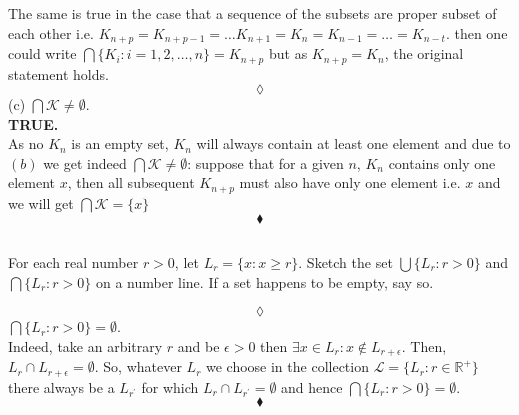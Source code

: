 The same is true in the case that a sequence of the subsets are proper subset of each other i.e. $K_{n+p}=K_{n+p-1}=\dots K_{n+1}=K_{n} = K_{n-1}=\dots =  K_{n-t}$. then one could write $\bigcap \{K_i:i=1,2,\dots,n\}= K_{n+p}$ but as $K_{n+p}=K_n$, the original statement holds.
$$\lozenge$$
(c) $\bigcap \mathscr{K}\ne \emptyset$.\\
\textbf{TRUE.\\}
As no $K_n$ is an empty set, $K_n$ will always contain at least one element and due to $(b)$ we get indeed $\bigcap \mathscr{K}\ne \emptyset$: suppose that for a given $n$, $K_n$ contains only one element $x$, then all subsequent $K_{n+p}$ must also have only one element i.e. $x$ and we will get $\bigcap \mathscr{K}=\{x\}$ 
$$\blacklozenge$$

\subsection{}
\begin{tcolorbox}
For each real number $r>0$, let $L_r=\{x:x\ge r\}$. Sketch the set $\bigcup \{L_r:r>0\}$ and $\bigcap\{L_r:r>0\}$ on a number line. If a set happens to be empty, say so.
\end{tcolorbox}
\begin{figure}[H]%
    \centering
    \subfloat[$\bigcup \{L_r:r>0\}$]{}
\label{fig:fig_p8b}
\end{figure}
$$\lozenge$$
$\bigcap\{L_r:r>0\}=\emptyset$.\\

Indeed, take an arbitrary $r$ and  be $\epsilon > 0$ then $\exists x\in L_r: x\not \in L_{r+\epsilon}$. Then, $L_r\cap L_{r+\epsilon} =\emptyset$. So, whatever $L_r$ we choose in the collection $\mathscr{L}=\{L_r: r\in\mathbb{R}^+\}$ there always be a $L_{r^{'}}$ for which $L_r\cap L_{r^{'}}=\emptyset$ and hence $\bigcap\{L_r:r>0\}=\emptyset$.
$$\blacklozenge$$
\newpage

